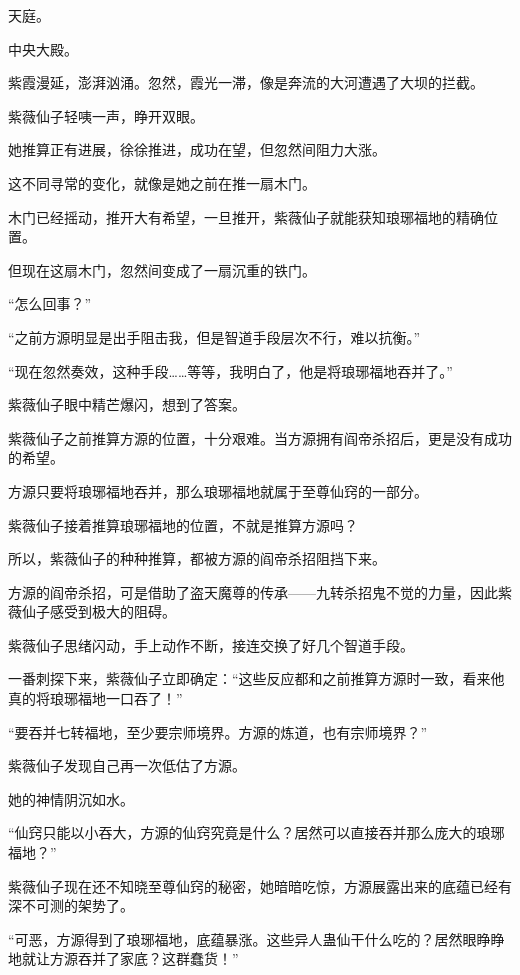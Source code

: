 
\begin{this_body}

天庭。

中央大殿。

紫霞漫延，澎湃汹涌。忽然，霞光一滞，像是奔流的大河遭遇了大坝的拦截。

紫薇仙子轻咦一声，睁开双眼。

她推算正有进展，徐徐推进，成功在望，但忽然间阻力大涨。

这不同寻常的变化，就像是她之前在推一扇木门。

木门已经摇动，推开大有希望，一旦推开，紫薇仙子就能获知琅琊福地的精确位置。

但现在这扇木门，忽然间变成了一扇沉重的铁门。

“怎么回事？”

“之前方源明显是出手阻击我，但是智道手段层次不行，难以抗衡。”

“现在忽然奏效，这种手段……等等，我明白了，他是将琅琊福地吞并了。”

紫薇仙子眼中精芒爆闪，想到了答案。

紫薇仙子之前推算方源的位置，十分艰难。当方源拥有阎帝杀招后，更是没有成功的希望。

方源只要将琅琊福地吞并，那么琅琊福地就属于至尊仙窍的一部分。

紫薇仙子接着推算琅琊福地的位置，不就是推算方源吗？

所以，紫薇仙子的种种推算，都被方源的阎帝杀招阻挡下来。

方源的阎帝杀招，可是借助了盗天魔尊的传承——九转杀招鬼不觉的力量，因此紫薇仙子感受到极大的阻碍。

紫薇仙子思绪闪动，手上动作不断，接连交换了好几个智道手段。

一番刺探下来，紫薇仙子立即确定：“这些反应都和之前推算方源时一致，看来他真的将琅琊福地一口吞了！”

“要吞并七转福地，至少要宗师境界。方源的炼道，也有宗师境界？”

紫薇仙子发现自己再一次低估了方源。

她的神情阴沉如水。

“仙窍只能以小吞大，方源的仙窍究竟是什么？居然可以直接吞并那么庞大的琅琊福地？”

紫薇仙子现在还不知晓至尊仙窍的秘密，她暗暗吃惊，方源展露出来的底蕴已经有深不可测的架势了。

“可恶，方源得到了琅琊福地，底蕴暴涨。这些异人蛊仙干什么吃的？居然眼睁睁地就让方源吞并了家底？这群蠢货！”


\end{this_body}
